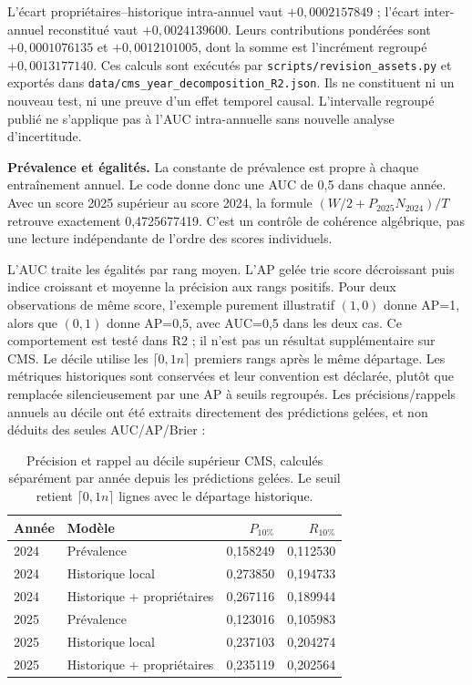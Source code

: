 \documentclass[10pt,a4paper]{article}
\newcommand{\src}[1]{{\small\nolinkurl{#1}}}
\begin{document}
\begin{table}[!htbp]\centering\small
\caption{Décomposition R2. L'AUC inter-annuelle est reconstituée à partir des autres termes, pas réévaluée sur les prédictions.}

\end{table}

L'écart propriétaires--historique intra-annuel vaut $+0,0002157849$ ; l'écart inter-annuel reconstitué vaut $+0,0024139600$. Leurs contributions pondérées sont $+0,0001076135$ et $+0,0012101005$, dont la somme est l'incrément regroupé $+0,0013177140$. Ces calculs sont exécutés par \src{scripts/revision_assets.py} et exportés dans \src{data/cms_year_decomposition_R2.json}. Ils ne constituent ni un nouveau test, ni une preuve d'un effet temporel causal. L'intervalle regroupé publié ne s'applique pas à l'AUC intra-annuelle sans nouvelle analyse d'incertitude.

\textbf{Prévalence et égalités.} La constante de prévalence est propre à chaque entraînement annuel. Le code donne donc une AUC de 0,5 dans chaque année. Avec un score 2025 supérieur au score 2024, la formule $(W/2+P_{2025}N_{2024})/T$ retrouve exactement 0,4725677419. C'est un contrôle de cohérence algébrique, pas une lecture indépendante de l'ordre des scores individuels.

L'AUC traite les égalités par rang moyen. L'AP gelée trie score décroissant puis indice croissant et moyenne la précision aux rangs positifs. Pour deux observations de même score, l'exemple purement illustratif $(1,0)$ donne AP=1, alors que $(0,1)$ donne AP=0,5, avec AUC=0,5 dans les deux cas. Ce comportement est testé dans R2 ; il n'est pas un résultat supplémentaire sur CMS. Le décile utilise les $\lceil0,1n\rceil$ premiers rangs après le même départage. Les métriques historiques sont conservées et leur convention est déclarée, plutôt que remplacée silencieusement par une AP à seuils regroupés. Les précisions/rappels annuels au décile ont été extraits directement des prédictions gelées, et non déduits des seules AUC/AP/Brier :
\begin{table}[!htbp]\centering\small
\caption{Précision et rappel au décile supérieur CMS, calculés séparément par année depuis les prédictions gelées. Le seuil retient $\lceil0,1n\rceil$ lignes avec le départage historique.}
\begin{tabular}{@{}llrr@{}}
\toprule
Année & Modèle & $P_{10\%}$ & $R_{10\%}$\\
\midrule
2024 & Prévalence & 0,158249 & 0,112530\\
2024 & Historique local & 0,273850 & 0,194733\\
2024 & Historique + propriétaires & 0,267116 & 0,189944\\
2025 & Prévalence & 0,123016 & 0,105983\\
2025 & Historique local & 0,237103 & 0,204274\\
2025 & Historique + propriétaires & 0,235119 & 0,202564\\
\bottomrule
\end{tabular}
\end{table}
\end{document}
